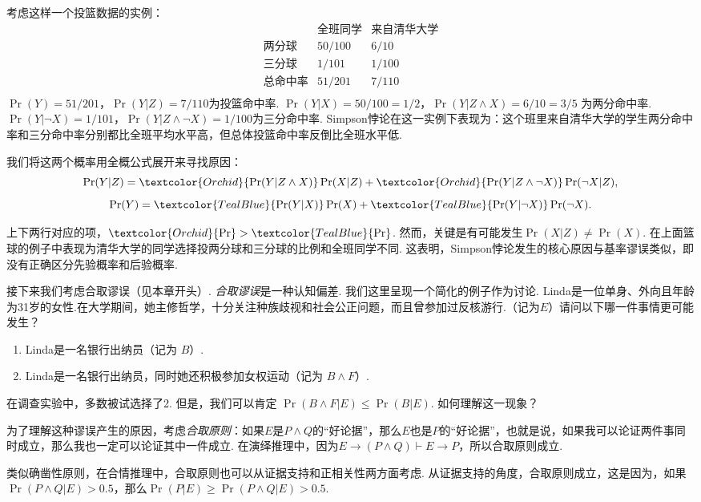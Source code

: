 考虑这样一个投篮数据的实例：
    \[
    \begin{array}{c|cc}
          & \text{全班同学} & \text{来自清华大学} \\ \hline
         \text{两分球} & 50/100 & 6/10 \\
         \text{三分球} & 1/101 & 1/100 \\
         \text{总命中率} & 51/201 & 7/110 \\
    \end{array}
    \]
$\Pr(Y) = 51/201$，$\Pr(Y|Z) = 7/110$为投篮命中率. $\Pr(Y|X) = 50/100 = 1/2$，$\Pr(Y|Z \wedge X) = 6/10 = 3/5$ 为两分命中率. $\Pr(Y|\neg X) = 1/101$，$\Pr(Y|Z \wedge \neg X) = 1/100$为三分命中率. Simpson悖论在这一实例下表现为：这个班里来自清华大学的学生两分命中率和三分命中率分别都比全班平均水平高，但总体投篮命中率反倒比全班水平低.

我们将这两个概率用全概公式展开来寻找原因：
$$\Pr(Y|Z) = \textcolor{Orchid}{\Pr(Y|Z\land X)}\Pr(X|Z) + \textcolor{Orchid}{\Pr(Y|Z\wedge\neg X)}\Pr(\neg X|Z),$$
$$\Pr(Y) = \textcolor{TealBlue}{\Pr(Y|X)}\Pr(X) +\textcolor{TealBlue}{ \Pr(Y|\neg X)}\Pr(\neg X).$$

上下两行对应的项，$\textcolor{Orchid}{\Pr}>\textcolor{TealBlue}{\Pr}$. 然而，关键是有可能发生$\Pr(X|Z) \neq \Pr(X)$. 在上面篮球的例子中表现为清华大学的同学选择投两分球和三分球的比例和全班同学不同. 这表明，Simpson悖论发生的核心原因与基率谬误类似，即没有正确区分先验概率和后验概率.

接下来我们考虑合取谬误（见本章开头）. \emph{合取谬误}是一种认知偏差. 我们这里呈现一个简化的例子作为讨论. Linda是一位单身、外向且年龄为31岁的女性.在大学期间，她主修哲学，十分关注种族歧视和社会公正问题，而且曾参加过反核游行.（记为$E$）请问以下哪一件事情更可能发生？
    \begin{enumerate}
        \item Linda是一名银行出纳员（记为 $B$）.
        \item Linda是一名银行出纳员，同时她还积极参加女权运动（记为 $B\wedge F$）.
    \end{enumerate}
在调查实验中，多数被试选择了2. 但是，我们可以肯定 $\Pr(B \land F|E) \le \Pr(B|E)$. 如何理解这一现象？

为了理解这种谬误产生的原因，考虑\emph{合取原则}：如果$E$是$P\wedge Q$的“好论据”，那么$E$也是$P$的“好论据”，也就是说，如果我可以论证两件事同时成立，那么我也一定可以论证其中一件成立. 在演绎推理中，因为$E\to(P\wedge Q)\vdash E\to P$，所以合取原则成立. 

类似确凿性原则，在合情推理中，合取原则也可以从证据支持和正相关性两方面考虑. 从证据支持的角度，合取原则成立，这是因为，如果$\Pr(P\wedge Q|E)>0.5$，那么$\Pr(P|E)\geq \Pr(P\wedge Q|E)>0.5$.

